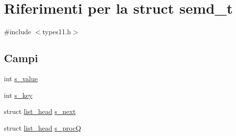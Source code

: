 \hypertarget{structsemd__t}{\section{Riferimenti per la struct semd\-\_\-t}
\label{structsemd__t}
}


{\ttfamily \#include $<$types11.\-h$>$}

\subsection*{Campi}
\begin{DoxyCompactItemize}
\item 
int \hyperlink{structsemd__t_a104d7150b55e51644df16fdc9814191f}{s\-\_\-value}
\item 
int \hyperlink{structsemd__t_a2f9b394e0876b74e8f9e0a53c8aa7e0c}{s\-\_\-key}
\item 
struct \hyperlink{structlist__head}{list\-\_\-head} \hyperlink{structsemd__t_a09cdbeceec30846f32399900706a408f}{s\-\_\-next}
\item 
struct \hyperlink{structlist__head}{list\-\_\-head} \hyperlink{structsemd__t_a9a531117316667eceb70495342c36be1}{s\-\_\-proc\-Q}
\end{DoxyCompactItemize}


